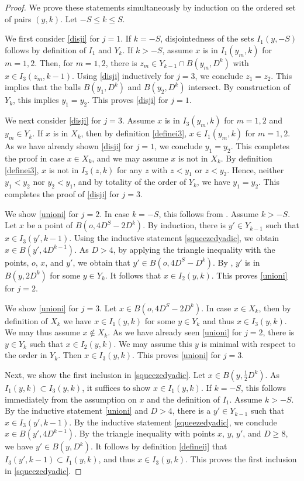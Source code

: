\documentclass[10pt,a4paper]{article}
\theoremstyle{plain}
\theoremstyle{definition}
\numberwithin{equation}{subsection}
\newcommand{\leanok}{}
\begin{document}
\begin{proof}
\leanok
We prove these statements simultaneously by induction on the ordered set of pairs $(y,k)$. Let $-S\le k\le S$.

We first consider \eqref{disji} for $j=1$. If $k=-S$, disjointedness of the sets $I_1(y,-S)$ follows by definition of $I_1$ and $Y_k$. If $k>-S$, assume $x$ is in $I_1(y_m,k)$ for $m=1,2$. Then, for $m=1,2$, there is $z_m\in Y_{k-1}\cap B(y_m,D^k)$ with $x\in I_3(z_m,k-1)$. Using \eqref{disji} inductively for $j=3$, we conclude $z_1=z_2$. This implies that the balls $B(y_1, D^k)$ and $B(y_2, D^k)$ intersect. By construction of $Y_k$, this implies $y_1=y_2$. This proves \eqref{disji} for $j=1$.

We next consider \eqref{disji} for $j=3$. Assume $x$ is in $I_3(y_m,k)$ for $m=1,2$ and $y_m\in Y_k$. If $x$ is in $X_k$, then by definition \eqref{definei3}, $x\in I_1(y_m,k)$ for $m=1,2$. As we have already shown \eqref{disji} for $j=1$, we conclude $y_1=y_2$. This completes the proof in case $x\in X_k$, and we may assume $x$ is not in $X_k$. By definition \eqref{definei3}, $x$ is not in $I_3(z,k)$ for any $z$ with $z<y_1$ or $z<y_2$. Hence, neither $y_1<y_2$ nor $y_2<y_1$, and by totality of the order of $Y_k$, we have $y_1=y_2$. This completes the proof of \eqref{disji} for $j=3$.

We show \eqref{unioni} for $j=2$. In case $k=-S$, this follows from . Assume $k>-S$. Let $x$ be a point of $B(o, 4D^S-2D^k)$. By induction, there is $y'\in Y_{k-1}$ such that $x\in I_3(y',k-1)$. Using the inductive statement \eqref{squeezedyadic}, we obtain $x\in B(y',4D^{k-1})$. As $D>4$, by applying the triangle inequality with the points, $o$, $x$, and $y'$, we obtain that $y'\in B(o, 4D^S-D^k)$. By , $y'$ is in $B(y,2D^k)$ for some $y\in Y_k$. It follows that $x\in I_2(y,k)$. This proves \eqref{unioni} for $j=2$.

We show \eqref{unioni} for $j=3$. Let $x\in B(o, 4D^S-2D^k)$. In case $x\in X_k$, then by definition of $X_k$ we have $x\in I_1(y,k)$ for some $y\in Y_k$ and thus $x\in I_3(y,k)$. We may thus assume $x\not\in X_k$. As we have already seen \eqref{unioni} for $j=2$, there is $y\in Y_k$ such that $x\in I_2(y,k)$. We may assume this $y$ is minimal with respect to the order in $Y_k$. Then $x\in I_3(y,k)$. This proves \eqref{unioni} for $j=3$.

Next, we show the first inclusion in \eqref{squeezedyadic}. Let $x\in B(y,\frac 12 D^k)$. As $I_1(y,k)\subset I_3(y,k)$, it suffices to show $x\in I_1(y,k)$. If $k=-S$, this follows immediately from the assumption on $x$ and the definition of $I_1$. Assume $k>-S$. By the inductive statement \eqref{unioni} and $D>4$, there is a $y'\in Y_{k-1}$ such that $x\in I_3(y',k-1)$. By the inductive statement \eqref{squeezedyadic}, we conclude $x\in B(y',4D^{k-1})$. By the triangle inequality with points $x$, $y$, $y'$, and $D\geq8$, we have $y'\in B(y,D^k)$. It follows by definition \eqref{defineij} that $I_3(y',k-1)\subset I_1(y,k)$, and thus $x\in I_3(y,k)$. This proves the first inclusion in \eqref{squeezedyadic}.


\end{proof}
\end{document}
